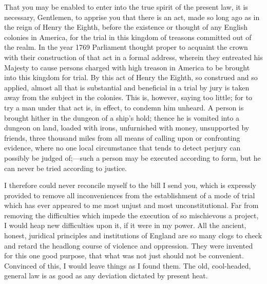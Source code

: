 That you may be enabled to enter into the true spirit of the present law, it is necessary, Gentlemen, to apprise you that there is an act, made so long ago as in the reign of Henry the Eighth, before the existence or thought of any English colonies in America, for the trial in this kingdom of treasons committed out of the realm. In the year 1769 Parliament thought proper to acquaint the crown with their construction of that act in a formal address, wherein they entreated his Majesty to cause persons charged with high treason in America to be brought into this kingdom for trial. By this act of Henry the Eighth, so construed and so applied, almost all that is substantial and beneficial in a trial by jury is taken away from the subject in the colonies. This is, however, saying too little; for to try a man under that act is, in effect, to condemn him unheard. A person is brought hither in the dungeon of a ship's hold; thence he is vomited into a dungeon on land, loaded with irons, unfurnished with money, unsupported by friends, three thousand miles from all means of calling upon or confronting evidence, where no one local circumstance that tends to detect perjury can possibly be judged of;—such a person may be executed according to form, but he can never be tried according to justice.

I therefore could never reconcile myself to the bill I send you, which is expressly provided to remove all inconveniences from the establishment of a mode of trial which has ever appeared to me most unjust and most unconstitutional. Far from removing the difficulties which impede the execution of so mischievous a project, I would heap new difficulties upon it, if it were in my power. All the ancient, honest, juridical principles and institutions of England are so many clogs to check and retard the headlong course of violence and oppression. They were invented for this one good purpose, that what was not just should not be convenient. Convinced of this, I would leave things as I found them. The old, cool-headed, general law is as good as any deviation dictated by present heat.

